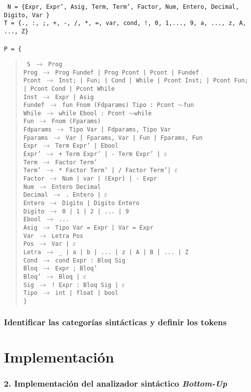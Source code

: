 \documentclass[12pt]{article}
\begin{document}
\noindent
\noindent
\texttt{
  \noindent
N = \{Expr, Expr', Asig, Term, Term', Factor, Num, Entero, Decimal, Digito, Var \}\\
T = \{., :, ;, +, -, /, *, =, var, cond, !, 0, 1,..., 9, a, ..., z, A, ..., Z\}\\ \\ 
P = \{}
\begin{quote}
  \texttt{
    S $\to$ Prog\\
    Prog $\to$ Prog Fundef | Prog Pcont | Pcont | Fundef\\
    Pcont $\to$ Inst; | Fun; | Cond | While | Pcont Inst; | Pcont Fun; | Pcont Cond | Pcont While\\
    Inst $\to$ Expr | Asig\\
    Fundef $\to$ fun Fnom (Fdparams) Tipo : Pcont $\sim$fun\\
    While $\to$ while Ebool : Pcont $\sim$while\\    
    Fun $\to$ Fnom (Fparams)\\
    Fdparams $\to$ Tipo Var | Fdparams, Tipo Var\\
    Fparams $\to$ Var | Fparams, Var | Fun | Fparams, Fun\\
    Expr  $\to$ Term Expr' | Ebool \\
    Expr' $\to$ + Term Expr' | - Term Expr' | $\varepsilon$ \\
    Term  $\to$ Factor Term' \\
    Term' $\to$ * Factor Term' | / Factor Term'| $\varepsilon$ \\
    Factor $\to$ Num | var | (Expr) | - Expr \\
    Num $\to$ Entero Decimal \\
    Decimal $\to$ . Entero | $\varepsilon$ \\
    Entero $\to$ Digito | Digito Entero \\
    Digito $\to$ 0 | 1 | 2 | ... | 9 \\
    Ebool $\to$ ... \\
    Asig $\to$ Tipo Var = Expr | Var = Expr \\
    Var  $\to$ Letra Pos \\
    Pos  $\to$ Var | $\varepsilon$ \\
    Letra $\to$ \_ | a | b | ... | z | A | B | ... | Z \\
    Cond $\to$ cond Expr : Bloq Sig \\
    Bloq $\to$ Expr ; Bloq'\\
    Bloq' $\to$ Bloq | $\varepsilon$\\ 
    Sig $\to$ ! Expr : Bloq Sig | $\varepsilon$ \\
    Tipo $\to$ int | float | bool \\
    \}
}
 
\end{quote}

\subsubsection*{Identificar las categorías sintácticas y definir los tokens}

\section{Implementación}
\subsubsection*{2. Implementación del analizador sintáctico \textit{Bottom-Up}}
\end{document}
